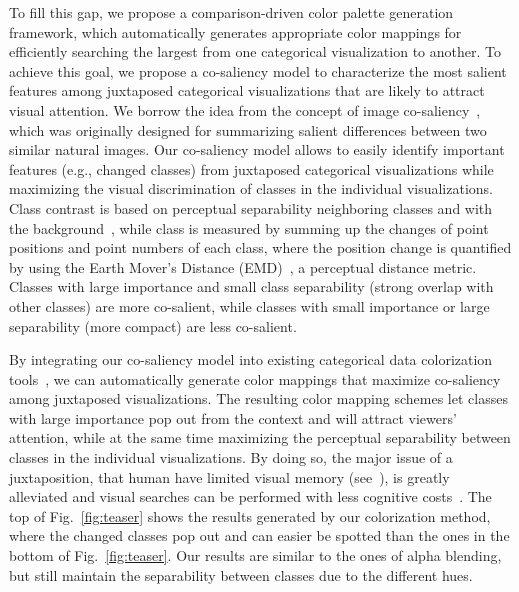 To fill this gap, we propose a comparison-driven color palette generation framework, which automatically generates appropriate color mappings for efficiently searching the largest  from one categorical visualization to another.
To achieve this goal, we propose a co-saliency model to characterize the most salient features among juxtaposed categorical visualizations that are likely to attract visual attention. We borrow the idea from the concept of image co-saliency~\cite{Jacobs10}, which was originally designed for summarizing salient differences between two similar natural images.
Our co-saliency model allows to easily identify important features (e.g., changed classes) from juxtaposed categorical visualizations while maximizing the visual discrimination of classes in the individual visualizations.  Class contrast is based on perceptual separability 
neighboring classes and with the background~\cite{Wang2018}, while
class 
is measured by summing up the changes of point positions and point numbers  of each class, where the position change is quantified by using the Earth Mover's Distance (EMD)~\cite{rubner2000earth}, a perceptual distance metric.
Classes with large importance and small class separability (strong overlap with other classes) are more co-salient, while classes with small importance or large separability (more compact) are less co-salient.

By integrating our co-saliency model into existing categorical data colorization tools~\cite{Lu21}, we can automatically generate color mappings that maximize co-saliency among juxtaposed visualizations. The resulting color mapping schemes let classes with large importance pop out from the context and will attract viewers' attention,  while at the same time maximizing the perceptual separability between classes in the individual visualizations. By doing so,
the major issue of a juxtaposition, that human have limited visual memory (see~\cite{Tominski12}), is greatly alleviated and visual searches can be performed with less cognitive costs~\cite{healey1995visualizing}.
%
The top of Fig.~\ref{fig:teaser} shows the results generated by our colorization method, where the changed classes pop out and can easier be spotted than the ones in the bottom of Fig.~\ref{fig:teaser}. Our results are similar to the ones of alpha blending, but still maintain the separability between classes due to the different hues.

